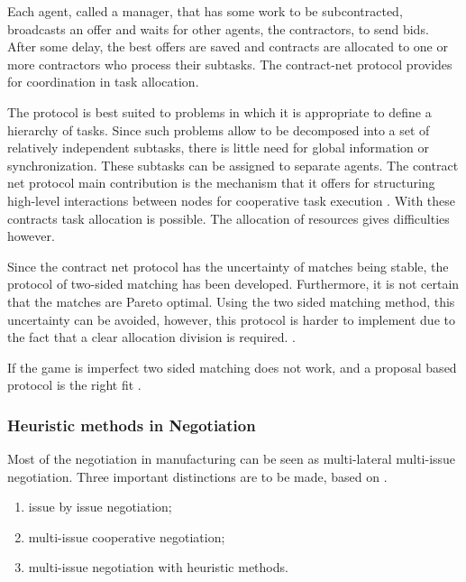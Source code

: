 Each agent, called a manager, that has some work to be subcontracted, broadcasts an offer and waits for other agents, the contractors, to send bids. After some delay, the best offers are saved and contracts are allocated to one or more contractors who process their subtasks. The contract-net protocol provides for coordination in task allocation. 

The protocol is best suited to problems in which it is appropriate to define a hierarchy of tasks. Since such problems allow to be decomposed into a set of relatively independent subtasks, there is little need for global information or synchronization. These subtasks can be assigned to separate agents. The contract net protocol main contribution is the mechanism that it offers for structuring high-level interactions between nodes for cooperative task execution \citep{smith1980communication}. With these contracts task allocation is possible. The allocation of resources gives difficulties however. 

Since the contract net protocol has the uncertainty of matches being stable, the protocol of two-sided matching has been developed. Furthermore, it is not certain that the matches are Pareto optimal. Using the two sided matching method, this uncertainty can be avoided, however, this protocol is harder to implement due to the fact that a clear allocation division is required. \citep{fatima2014principles}.
 
If the game is imperfect two sided matching does not work, and a proposal based protocol is the right fit \citep{rahwan2003argumentation}.





\subsubsection{Heuristic methods in Negotiation}
\label{sec:lit:learn}
Most of the negotiation in manufacturing can be seen as multi-lateral multi-issue negotiation. Three important distinctions are to be made, based on \citet{lai2004literature}. 
\begin{enumerate}
	\item
	issue by issue negotiation;
	\item
	multi-issue cooperative negotiation;
	\item
	multi-issue negotiation with heuristic methods.
	\end{enumerate}
	
